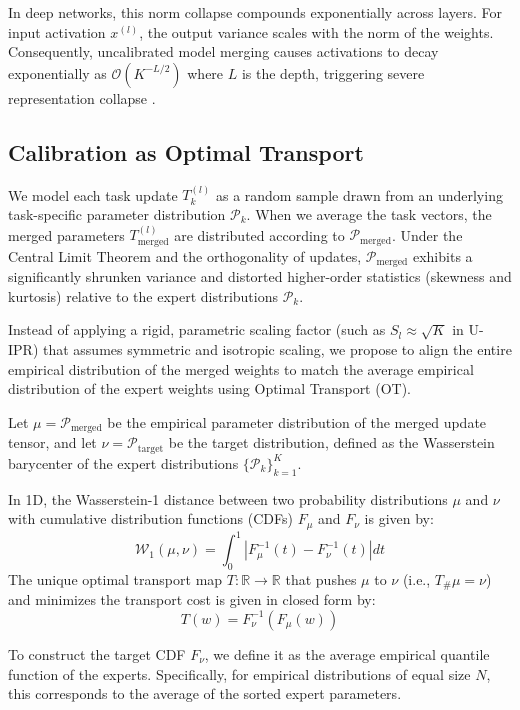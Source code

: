\documentclass{article}
\theoremstyle{plain}
\theoremstyle{definition}
\theoremstyle{remark}
\begin{document}
In deep networks, this norm collapse compounds exponentially across layers. For input activation $x^{(l)}$, the output variance scales with the norm of the weights. Consequently, uncalibrated model merging causes activations to decay exponentially as $\mathcal{O}(K^{-L/2})$ where $L$ is the depth, triggering severe representation collapse \citep{jordan2023repair}.

\subsection{Calibration as Optimal Transport}
We model each task update $T^{(l)}_k$ as a random sample drawn from an underlying task-specific parameter distribution $\mathcal{P}_k$. When we average the task vectors, the merged parameters $T^{(l)}_{\text{merged}}$ are distributed according to $\mathcal{P}_{\text{merged}}$. Under the Central Limit Theorem and the orthogonality of updates, $\mathcal{P}_{\text{merged}}$ exhibits a significantly shrunken variance and distorted higher-order statistics (skewness and kurtosis) relative to the expert distributions $\mathcal{P}_k$.

Instead of applying a rigid, parametric scaling factor (such as $S_l \approx \sqrt{K}$ in U-IPR) that assumes symmetric and isotropic scaling, we propose to align the entire empirical distribution of the merged weights to match the average empirical distribution of the expert weights using Optimal Transport (OT).

Let $\mu = \mathcal{P}_{\text{merged}}$ be the empirical parameter distribution of the merged update tensor, and let $\nu = \mathcal{P}_{\text{target}}$ be the target distribution, defined as the Wasserstein barycenter of the expert distributions $\{\mathcal{P}_k\}_{k=1}^K$.

In 1D, the Wasserstein-1 distance between two probability distributions $\mu$ and $\nu$ with cumulative distribution functions (CDFs) $F_{\mu}$ and $F_{\nu}$ is given by:
\begin{equation}
  \mathcal{W}_1( \mu, \nu ) = \int_0^1 \left| F_{\mu}^{-1}(t) - F_{\nu}^{-1}(t) \right| dt
\end{equation}
The unique optimal transport map $T: \mathbb{R} \to \mathbb{R}$ that pushes $\mu$ to $\nu$ (i.e., $T_\# \mu = \nu$) and minimizes the transport cost is given in closed form by:
\begin{equation}
  T(w) = F_{\nu}^{-1}(F_{\mu}(w))
\end{equation}

To construct the target CDF $F_{\nu}$, we define it as the average empirical quantile function of the experts. Specifically, for empirical distributions of equal size $N$, this corresponds to the average of the sorted expert parameters.
\end{document}
